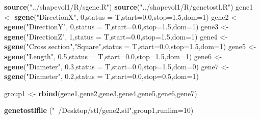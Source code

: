 \documentclass[]{article}
\newenvironment{Shaded}{\begin{snugshade}}{\end{snugshade}}
\newcommand{\DataTypeTok}[1]{\textcolor[rgb]{0.13,0.29,0.53}{#1}}
\newcommand{\DecValTok}[1]{\textcolor[rgb]{0.00,0.00,0.81}{#1}}
\newcommand{\FloatTok}[1]{\textcolor[rgb]{0.00,0.00,0.81}{#1}}
\newcommand{\KeywordTok}[1]{\textcolor[rgb]{0.13,0.29,0.53}{\textbf{#1}}}
\newcommand{\NormalTok}[1]{#1}
\newcommand{\StringTok}[1]{\textcolor[rgb]{0.31,0.60,0.02}{#1}}
\begin{document}
\begin{Shaded}
\begin{Highlighting}[]
\KeywordTok{source}\NormalTok{(}\StringTok{"../shapevol1/R/sgene.R"}\NormalTok{)}
\KeywordTok{source}\NormalTok{(}\StringTok{"../shapevol1/R/genetostl.R"}\NormalTok{)}
\NormalTok{gene1 <-}\StringTok{ }\KeywordTok{sgene}\NormalTok{(}\StringTok{"DirectionX"}\NormalTok{,          }\DecValTok{0}\NormalTok{,}\DataTypeTok{status =}\NormalTok{ T,}\DataTypeTok{start=}\FloatTok{0.0}\NormalTok{,}\DataTypeTok{stop=}\FloatTok{1.5}\NormalTok{,}\DataTypeTok{dom=}\DecValTok{1}\NormalTok{)}
\NormalTok{gene2 <-}\StringTok{ }\KeywordTok{sgene}\NormalTok{(}\StringTok{"DirectionY"}\NormalTok{,          }\DecValTok{0}\NormalTok{,}\DataTypeTok{status =}\NormalTok{ T,}\DataTypeTok{start=}\FloatTok{0.0}\NormalTok{,}\DataTypeTok{stop=}\FloatTok{1.5}\NormalTok{,}\DataTypeTok{dom=}\DecValTok{1}\NormalTok{)}
\NormalTok{gene3 <-}\StringTok{ }\KeywordTok{sgene}\NormalTok{(}\StringTok{"DirectionZ"}\NormalTok{,          }\DecValTok{1}\NormalTok{,}\DataTypeTok{status =}\NormalTok{ T,}\DataTypeTok{start=}\FloatTok{0.0}\NormalTok{,}\DataTypeTok{stop=}\FloatTok{1.5}\NormalTok{,}\DataTypeTok{dom=}\DecValTok{1}\NormalTok{)}
\NormalTok{gene4 <-}\StringTok{ }\KeywordTok{sgene}\NormalTok{(}\StringTok{"Cross section"}\NormalTok{,}\StringTok{"Square"}\NormalTok{,}\DataTypeTok{status =}\NormalTok{ T,}\DataTypeTok{start=}\FloatTok{0.0}\NormalTok{,}\DataTypeTok{stop=}\FloatTok{1.5}\NormalTok{,}\DataTypeTok{dom=}\DecValTok{1}\NormalTok{)}
\NormalTok{gene5 <-}\StringTok{ }\KeywordTok{sgene}\NormalTok{(}\StringTok{"Length"}\NormalTok{,            }\FloatTok{0.5}\NormalTok{,}\DataTypeTok{status =}\NormalTok{ T,}\DataTypeTok{start=}\FloatTok{0.0}\NormalTok{,}\DataTypeTok{stop=}\FloatTok{1.5}\NormalTok{,}\DataTypeTok{dom=}\DecValTok{1}\NormalTok{)}
\NormalTok{gene6 <-}\StringTok{ }\KeywordTok{sgene}\NormalTok{(}\StringTok{"Diameter"}\NormalTok{,          }\FloatTok{0.3}\NormalTok{,}\DataTypeTok{status =}\NormalTok{ T,}\DataTypeTok{start=}\FloatTok{0.0}\NormalTok{,}\DataTypeTok{stop=}\FloatTok{1.5}\NormalTok{,}\DataTypeTok{dom=}\DecValTok{0}\NormalTok{)}
\NormalTok{gene7 <-}\StringTok{ }\KeywordTok{sgene}\NormalTok{(}\StringTok{"Diameter"}\NormalTok{,          }\FloatTok{0.2}\NormalTok{,}\DataTypeTok{status =}\NormalTok{ T,}\DataTypeTok{start=}\FloatTok{0.0}\NormalTok{,}\DataTypeTok{stop=}\FloatTok{0.5}\NormalTok{,}\DataTypeTok{dom=}\DecValTok{1}\NormalTok{)}

\NormalTok{group1 <-}\StringTok{ }\KeywordTok{rbind}\NormalTok{(gene1,gene2,gene3,gene4,gene5,gene6,gene7)}

\KeywordTok{genetostlfile}\NormalTok{   (}\StringTok{"~/Desktop/stl/gene2.stl"}\NormalTok{,group1,}\DataTypeTok{runlim=}\DecValTok{10}\NormalTok{)}
\end{Highlighting}
\end{Shaded}
\end{document}
